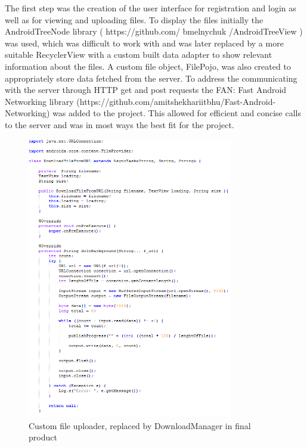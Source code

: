 \documentclass[11pt]{article}
\begin{document}
The first step was the creation of the user interface for registration and login as well as for viewing and uploading files. To display the files initially the AndroidTreeNode library ( https://github.com/ bmelnychuk /AndroidTreeView ) was used, which was difficult to work with and was later replaced by a more suitable RecyclerView with a custom built data adapter to show relevant information about the files. A custom file object, FilePojo, was also created to appropriately store data fetched from the server.
To address the communicating with the server through HTTP get and post requests the FAN: Fast Android Networking library (https://github.com/amitshekhariitbhu/Fast-Android-Networking) was added to the project. This allowed for efficient and concise calls to the server and was in most ways the best fit for the project. 


\begin{figure} [H]
\caption{Custom file uploader, replaced by DownloadManager in final product}
\centering
\includegraphics[width=0.8\textwidth]{downloadclass.PNG}
\end{figure}
\end{document}
